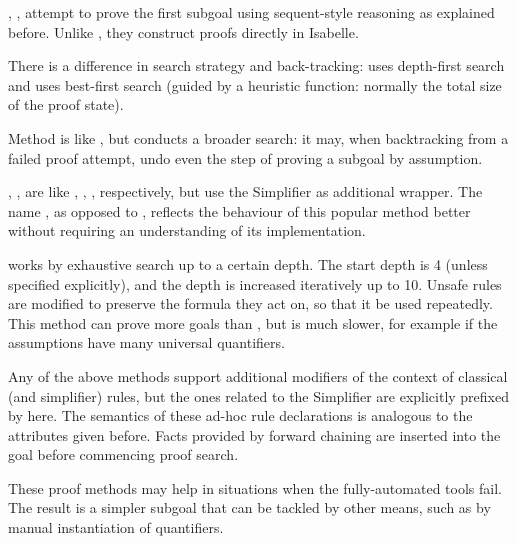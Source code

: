 \begin{isabellebody}
\begin{isamarkuptext}
\begin{description}
  \item \hyperlink{method.fast}{\mbox{}}, \hyperlink{method.best}{\mbox{}}, \hyperlink{method.slow}{\mbox{}} attempt to
  prove the first subgoal using sequent-style reasoning as explained
  before.  Unlike \hyperlink{method.blast}{\mbox{}}, they construct proofs directly in
  Isabelle.

  There is a difference in search strategy and back-tracking: \hyperlink{method.fast}{\mbox{}} uses depth-first search and \hyperlink{method.best}{\mbox{}} uses best-first
  search (guided by a heuristic function: normally the total size of
  the proof state).

  Method \hyperlink{method.slow}{\mbox{}} is like \hyperlink{method.fast}{\mbox{}}, but conducts a broader
  search: it may, when backtracking from a failed proof attempt, undo
  even the step of proving a subgoal by assumption.

  \item \hyperlink{method.fastforce}{\mbox{}}, \hyperlink{method.slowsimp}{\mbox{}}, \hyperlink{method.bestsimp}{\mbox{}} are
  like \hyperlink{method.fast}{\mbox{}}, \hyperlink{method.slow}{\mbox{}}, \hyperlink{method.best}{\mbox{}}, respectively,
  but use the Simplifier as additional wrapper. The name \hyperlink{method.fastforce}{\mbox{}},
  as opposed to , reflects the behaviour of this popular
  method better without requiring an understanding of its implementation.

  \item \hyperlink{method.deepen}{\mbox{}} works by exhaustive search up to a certain
  depth.  The start depth is 4 (unless specified explicitly), and the
  depth is increased iteratively up to 10.  Unsafe rules are modified
  to preserve the formula they act on, so that it be used repeatedly.
  This method can prove more goals than \hyperlink{method.fast}{\mbox{}}, but is much
  slower, for example if the assumptions have many universal
  quantifiers.

  \end{description}

  Any of the above methods support additional modifiers of the context
  of classical (and simplifier) rules, but the ones related to the
  Simplifier are explicitly prefixed by  here.  The
  semantics of these ad-hoc rule declarations is analogous to the
  attributes given before.  Facts provided by forward chaining are
  inserted into the goal before commencing proof search.%
\end{isamarkuptext}%
\isamarkuptrue%
%
\isamarkuptrue%
%
\begin{isamarkuptext}%
These proof methods may help in situations when the
  fully-automated tools fail.  The result is a simpler subgoal that
  can be tackled by other means, such as by manual instantiation of
  quantifiers.


\end{isamarkuptext}
\end{isabellebody}
